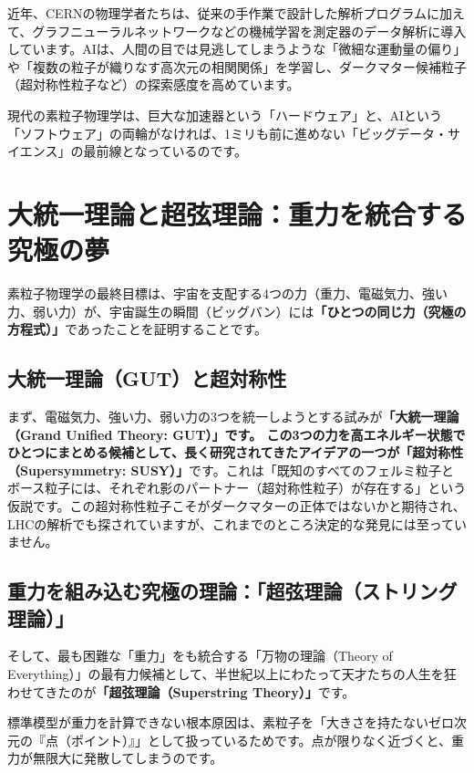 近年、CERNの物理学者たちは、従来の手作業で設計した解析プログラムに加えて、グラフニューラルネットワークなどの機械学習を測定器のデータ解析に導入しています。AIは、人間の目では見逃してしまうような「微細な運動量の偏り」や「複数の粒子が織りなす高次元の相関関係」を学習し、ダークマター候補粒子（超対称性粒子など）の探索感度を高めています。

現代の素粒子物理学は、巨大な加速器という「ハードウェア」と、AIという「ソフトウェア」の両輪がなければ、1ミリも前に進めない「ビッグデータ・サイエンス」の最前線となっているのです。

\section{大統一理論と超弦理論：重力を統合する究極の夢}

素粒子物理学の最終目標は、宇宙を支配する4つの力（重力、電磁気力、強い力、弱い力）が、宇宙誕生の瞬間（ビッグバン）には\textbf{「ひとつの同じ力（究極の方程式）」}であったことを証明することです。

\subsection{大統一理論（GUT）と超対称性}

まず、電磁気力、強い力、弱い力の3つを統一しようとする試みが\textbf{「大統一理論（Grand Unified Theory: GUT）」です。 この3つの力を高エネルギー状態でひとつにまとめる候補として、長く研究されてきたアイデアの一つが「超対称性（Supersymmetry: SUSY）」}です。これは「既知のすべてのフェルミ粒子とボース粒子には、それぞれ影のパートナー（超対称性粒子）が存在する」という仮説です。この超対称性粒子こそがダークマターの正体ではないかと期待され、LHCの解析でも探されていますが、これまでのところ決定的な発見には至っていません。

\subsection{重力を組み込む究極の理論：「超弦理論（ストリング理論）」}

そして、最も困難な「重力」をも統合する「万物の理論（Theory of Everything）」の最有力候補として、半世紀以上にわたって天才たちの人生を狂わせてきたのが\textbf{「超弦理論（Superstring Theory）」}です。

標準模型が重力を計算できない根本原因は、素粒子を「大きさを持たないゼロ次元の『点（ポイント）』」として扱っているためです。点が限りなく近づくと、重力が無限大に発散してしまうのです。


